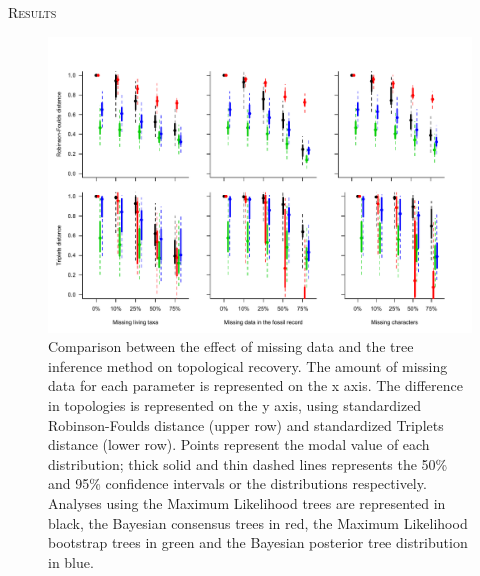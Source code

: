 \documentclass[12pt,letterpaper]{article}
\renewcommand{\section}[1]{%
\bigskip
\begin{center}
\begin{Large}
\normalfont\scshape #1
\medskip
\end{Large}
\end{center}}
\renewcommand{\subsection}[1]{%
\bigskip
\begin{center}
\begin{large}
\normalfont\itshape #1
\end{large}
\end{center}}
\begin{document}
%
%

\section{Results}



\begin{figure} 
\centering
    \includegraphics[width=1\textwidth]{Figures/In_main/AllMethods-RF+Tr-colour.pdf}
\caption{Comparison between the effect of missing data and the tree inference method on topological recovery. The amount of missing data for each parameter is represented on the x axis. The difference in topologies is represented on the y axis, using standardized Robinson-Foulds distance (upper row) and standardized Triplets distance (lower row). Points represent the modal value of each distribution; thick solid and thin dashed lines represents the 50\% and 95\% confidence intervals or the distributions respectively. Analyses using the Maximum Likelihood trees are represented in black, the Bayesian consensus %
trees in red, the Maximum Likelihood bootstrap trees in green and the Bayesian posterior tree distribution in blue.}
\label{Fig_Results-permeth_perparam} %
\end{figure}
\end{document}
